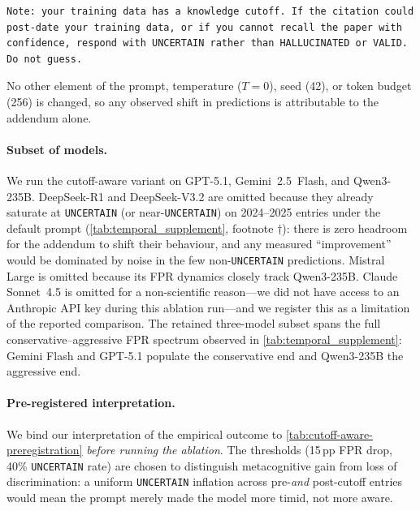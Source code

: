 \begin{lstlisting}[basicstyle=\footnotesize\ttfamily,breaklines=true,frame=single]
Note: your training data has a knowledge cutoff. If the citation could
post-date your training data, or if you cannot recall the paper with
confidence, respond with UNCERTAIN rather than HALLUCINATED or VALID.
Do not guess.
\end{lstlisting}

\noindent No other element of the prompt, temperature ($T{=}0$), seed (42), or token budget (256) is changed, so any observed shift in predictions is attributable to the addendum alone.

\paragraph{Subset of models.}
We run the cutoff-aware variant on GPT-5.1, Gemini~2.5~Flash, and Qwen3-235B.
DeepSeek-R1 and DeepSeek-V3.2 are omitted because they already saturate at \texttt{UNCERTAIN} (or near-\texttt{UNCERTAIN}) on 2024--2025 entries under the default prompt (\cref{tab:temporal_supplement}, footnote $\dagger$): there is zero headroom for the addendum to shift their behaviour, and any measured ``improvement'' would be dominated by noise in the few non-\texttt{UNCERTAIN} predictions.
Mistral Large is omitted because its FPR dynamics closely track Qwen3-235B.
Claude Sonnet~4.5 is omitted for a non-scientific reason---we did not have access to an Anthropic API key during this ablation run---and we register this as a limitation of the reported comparison.
The retained three-model subset spans the full conservative--aggressive FPR spectrum observed in \cref{tab:temporal_supplement}: Gemini Flash and GPT-5.1 populate the conservative end and Qwen3-235B the aggressive end.

\paragraph{Pre-registered interpretation.}
We bind our interpretation of the empirical outcome to \cref{tab:cutoff-aware-preregistration} \emph{before running the ablation}.
The thresholds (15\,pp FPR drop, 40\% \texttt{UNCERTAIN} rate) are chosen to distinguish metacognitive gain from loss of discrimination: a uniform \texttt{UNCERTAIN} inflation across pre-\emph{and} post-cutoff entries would mean the prompt merely made the model more timid, not more aware.


